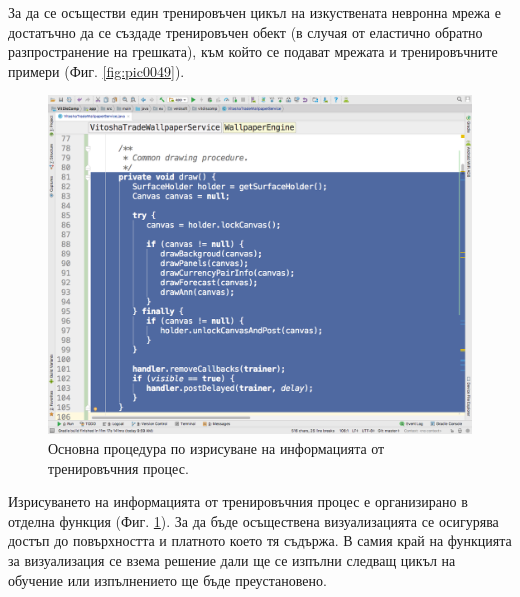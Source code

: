 \documentclass[book,14pt,oneside,openany]{memoir}
\begin{document}
За да се осъществи един тренировъчен цикъл на изкуствената невронна мрежа е достатъчно да се създаде тренировъчен обект (в случая от еластично обратно разпространение на грешката), към който се подават мрежата и тренировъчните примери (Фиг. \ref{fig:pic0049}).

\begin{figure}[h]
  \centering
  \includegraphics[height=0.45\pdfpageheight]{./images/pic0050.png}
  \caption{Основна процедура по изрисуване на информацията от тренировъчния процес.}
\label{fig:pic0050}
\end{figure}
\FloatBarrier

Изрисуването на информацията от тренировъчния процес е организирано в отделна функция (Фиг. \ref{fig:pic0050}). За да бъде осъществена визуализацията се осигурява достъп до повърхността и платното което тя съдържа. В самия край на функцията за визуализация се взема решение дали ще се изпълни следващ цикъл на обучение или изпълнението ще бъде преустановено. 
\end{document}
